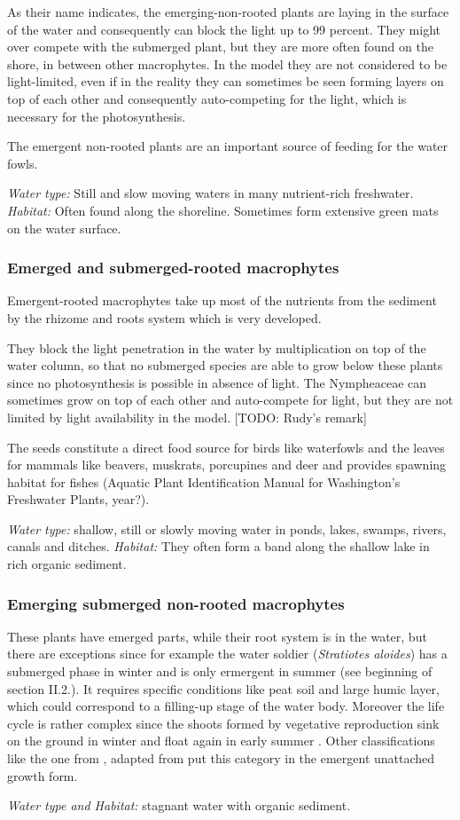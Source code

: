 As their name indicates, the emerging-non-rooted plants are laying in the surface of the water
and consequently can block the light up to 99 percent. They might over compete with the submerged
plant, but they are more often found on the shore, in between other macrophytes. In the model they
are not considered to be light-limited, even if in the reality they can sometimes be seen forming
layers on top of each other and consequently auto-competing for the light, which is necessary for
the photosynthesis.

The emergent non-rooted plants are an important source of feeding for the water fowls.

\emph{Water type:} Still and slow moving waters in many nutrient-rich freshwater.\newline
\emph{Habitat:} Often found along the shoreline. Sometimes form extensive green mats on the water surface.

\subsubsection*{Emerged and submerged-rooted macrophytes}
Emergent-rooted macrophytes take up most of the nutrients from the sediment by the rhizome and roots
system which is very developed.

They block the light penetration in the water by multiplication on top of the water column, so that no
submerged species are able to grow below these plants since no photosynthesis is possible in absence
of light. The Nympheaceae can sometimes grow on top of each other and auto-compete for light, but they
are not limited by light availability in the model. [TODO: Rudy's remark]

The seeds constitute a direct food source for birds like waterfowls and the leaves for mammals like
beavers, muskrats, porcupines and deer and provides spawning habitat for fishes (Aquatic Plant
Identification Manual for Washington's Freshwater Plants, year?).

\emph{Water type:} shallow, still or slowly moving water in ponds, lakes, swamps, rivers, canals and ditches.\newline
\emph{Habitat:} They often form a band along the shallow lake in rich organic sediment.

\subsubsection*{Emerging submerged non-rooted macrophytes}
These plants have emerged parts, while their root system is in the water, but there are exceptions
since for example the water soldier (\emph{Stratiotes aloides}) has a submerged phase in winter and is only ermergent
in summer (see beginning of section II.2.). It requires specific conditions like peat soil and large
humic layer, which could correspond to a filling-up stage of the water body. Moreover the life
cycle is rather complex since the shoots formed by vegetative reproduction sink on the ground
in winter and float again in early summer \citep{Pot}. Other classifications like the one from
\citet{Dodds}, adapted from \citet{Riener} put this category in the emergent unattached growth form.

\emph{Water type and Habitat:} stagnant water with organic sediment.
